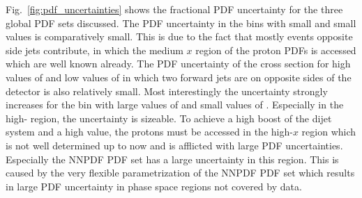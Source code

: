 Fig.~\ref{fig:pdf_uncertainties} shows the fractional PDF uncertainty for the
three global PDF sets discussed. The PDF uncertainty in the bins with small
\ystar and small \yboost values is comparatively small. This is due to the fact
that mostly events opposite side jets contribute, in which the medium $x$ region
of the proton PDFs is accessed which are well known already. The PDF uncertainty
of the cross section for high values of \ystar and low values of \yboost in
which two forward jets are on opposite sides of the detector is also relatively
small. Most interestingly the uncertainty strongly increases for the bin with
large values of \yboost and small values of \ystar.  Especially in the high-\pt
region, the uncertainty is sizeable. To achieve a high boost of the dijet system
and a high \ptavg value, the protons must be accessed in the high-$x$ region
which is not well determined up to now and is afflicted with large PDF
uncertainties. Especially the NNPDF PDF set has a large uncertainty in this
region. This is caused by the very flexible parametrization of the NNPDF PDF set
which results in large PDF uncertainty in phase space regions not covered by
data.

